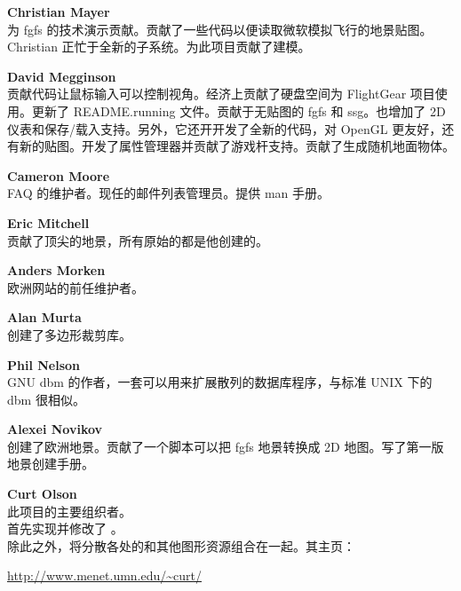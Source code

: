 \noindent \textbf{Christian Mayer}\\
为 fgfs 的技术演示贡献。贡献了一些代码以便读取微软模拟飞行的地景贴图。Christian 正忙于全新的子系统。为此项目贡献了建模。
 \medskip

\noindent \textbf{David Megginson}\\
贡献代码让鼠标输入可以控制视角。经济上贡献了硬盘空间为 FlightGear 项目使用。更新了 README.running 文件。贡献于无贴图的 fgfs 和 ssg。也增加了 2D 仪表和保存/载入支持。另外，它还开开发了全新的代码，对 OpenGL 更友好，还有新的贴图。开发了属性管理器并贡献了游戏杆支持。贡献了生成随机地面物体。
 \medskip

 \medskip

\noindent \textbf{Cameron Moore}\\
FAQ 的维护者。现任的邮件列表管理员。提供 man 手册。
 \medskip

\noindent \textbf{Eric Mitchell}\\
贡献了顶尖的地景，所有原始的都是他创建的。
 \medskip

\noindent \textbf{Anders Morken}\\
欧洲网站的前任维护者。
  \medskip

\noindent \textbf{Alan Murta}\\
创建了多边形裁剪库。
 \medskip
 
   \medskip

\noindent \textbf{Phil Nelson}\\
GNU dbm 的作者，一套可以用来扩展散列的数据库程序，与标准 UNIX 下的 dbm 很相似。
  \medskip

\noindent \textbf{Alexei Novikov}\\
创建了欧洲地景。贡献了一个脚本可以把 fgfs 地景转换成 2D 地图。写了第一版地景创建手册。
  \medskip

\noindent \textbf{Curt Olson}\\
此项目的主要组织者。\\首先实现并修改了 。\\除此之外，将分散各处的和其他图形资源组合在一起。其主页：

 \href{http://www.menet.umn.edu/~curt/}{http://www.menet.umn.edu/\~{}curt/}
 \medskip

